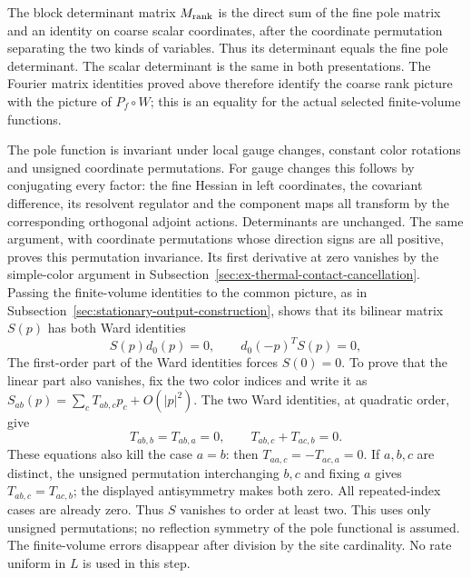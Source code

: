 The block determinant matrix $M_{\rm rank}$ is the direct sum of the
fine pole matrix and an identity on coarse scalar coordinates,
after the coordinate permutation separating the two kinds of
variables. Thus its determinant equals the fine pole determinant.
The scalar determinant is the same in both presentations. The
Fourier matrix identities proved above therefore identify the
coarse rank picture with the picture of $P_f\circ W$; this is
an equality for the actual selected finite-volume functions.

The pole function is invariant under local gauge changes, constant
color rotations and unsigned coordinate permutations. For gauge changes this
follows by conjugating every factor: the fine Hessian in left
coordinates, the covariant difference, its resolvent regulator and
the component maps all transform by the corresponding orthogonal
adjoint actions. Determinants are unchanged. The same argument,
with coordinate permutations whose direction signs are all positive,
proves this permutation invariance. Its first derivative at zero vanishes by the
simple-color argument in
Subsection~\ref{sec:ex-thermal-contact-cancellation}.
Passing the finite-volume identities to the common picture, as in
Subsection~\ref{sec:stationary-output-construction}, shows that its
bilinear matrix $S(p)$ has both Ward identities
\[
 S(p)d_0(p)=0,\qquad d_0(-p)^T S(p)=0,
\]
The first-order part of the Ward identities forces $S(0)=0$.
To prove that the linear part also vanishes, fix the two color indices
and write it as $S_{ab}(p)=\sum_c T_{ab,c}p_c+O(|p|^2)$.
The two Ward identities, at quadratic order, give
\[
 T_{ab,b}=T_{ab,a}=0,\qquad T_{ab,c}+T_{ac,b}=0.
\]
These equations also kill the case $a=b$: then
$T_{aa,c}=-T_{ac,a}=0$. If $a,b,c$ are distinct, the unsigned
permutation interchanging $b,c$ and fixing $a$ gives
$T_{ab,c}=T_{ac,b}$; the displayed antisymmetry makes both zero.
All repeated-index cases are already zero. Thus $S$ vanishes to
order at least two. This uses only unsigned permutations; no
reflection symmetry of the pole functional is assumed. The
finite-volume errors disappear after division by the site
cardinality. No rate uniform in $L$ is used in this step.


